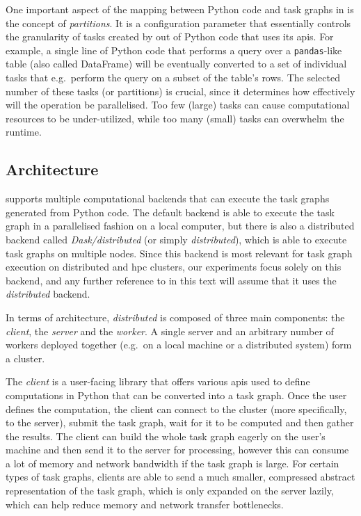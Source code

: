 One important aspect of the mapping between Python code and task graphs in
\dask{} is the concept of \emph{partitions}. It is a configuration
parameter that essentially controls the granularity of tasks created by \dask{}
out of Python code that uses its \glspl{api}. For example, a single line of Python
code that performs a query over a \texttt{pandas}-like table (also called DataFrame)
will be eventually converted to a set of individual tasks that e.g.\ perform the query on a subset
of the table's rows. The selected number of these tasks (or partitions) is crucial, since it
determines how effectively will the operation be parallelised. Too few (large) tasks can cause
computational resources to be under-utilized, while too many (small) tasks can overwhelm the
\dask{} runtime.

\subsection*{Architecture}
\dask{} supports multiple computational backends that can execute the task
graphs generated from Python code. The default backend is able to execute the task graph in a
parallelised fashion on a local computer, but there is also a distributed backend called
\emph{Dask/distributed}
(or simply \emph{distributed}), which is able to execute task graphs on
multiple nodes. Since this backend is most relevant for task graph execution on distributed and
\gls{hpc} clusters, our experiments focus solely on this backend, and any further
reference to \dask{} in this text will assume that it uses the
\emph{distributed} backend.

In terms of architecture, \emph{distributed} is composed of three main components: the
\emph{client}, the \emph{server} and the \emph{worker}. A
single server and an arbitrary number of workers deployed together (e.g.\ on a local machine or a
distributed system) form a \dask{} cluster.

The \emph{client} is a user-facing library that offers various
\glspl{api} used to define computations in Python that can be converted into a task
graph. Once the user defines the computation, the client can connect to the
\dask{} cluster (more specifically, to the server), submit the task graph, wait
for it to be computed and then gather the results. The client can build the whole task graph
eagerly on the user's machine and then send it to the server for processing, however this can
consume a lot of memory and network bandwidth if the task graph is large. For certain types of task
graphs, clients are able to send a much smaller, compressed abstract representation of the task
graph, which is only expanded on the server lazily, which can help reduce memory and network
transfer bottlenecks.

